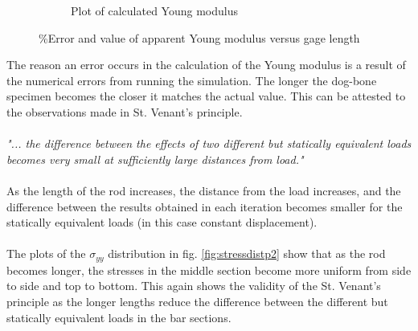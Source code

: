 \documentclass[paper=letter, fontsize=11pt]{scrartcl} %
\numberwithin{equation}{section} %
\numberwithin{figure}{section} %
\numberwithin{table}{section} %
\begin{document}
\begin{figure}[h]
\begin{subfigure}[b]{0.45\textwidth}
		\caption{Plot of calculated Young modulus}
		\label{fig:q2fig2}
	\end{subfigure}
	\caption{\%Error and value of apparent Young modulus versus gage length}
\end{figure}

The reason an error occurs in the calculation of the Young modulus is a result of the numerical errors from running the simulation. The longer the dog-bone specimen becomes the closer it matches the actual value. This can be attested to the observations made in St. Venant's principle.
\\\\
\textit{"... the difference between the effects of two different but statically equivalent loads becomes very small at sufficiently large distances from load."}
\\\\
As the length of the rod increases, the distance from the load increases, and the difference between the results obtained in each iteration becomes smaller for the statically equivalent loads (in this case constant displacement). 
\\\\
The plots of the $\sigma_{yy}$ distribution in fig. \ref{fig:stressdistp2} show that as the rod becomes longer, the stresses in the middle section become more uniform from side to side and top to bottom. This again shows the validity of the St. Venant's principle as the longer lengths reduce the difference between the different but statically equivalent loads in the bar sections.
\end{document}

